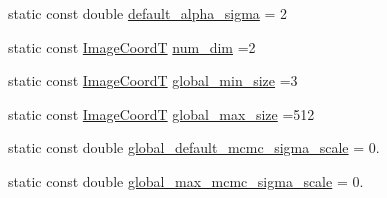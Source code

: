 \begin{DoxyCompactItemize}
static const double \hyperlink{classmappel_1_1PointEmitterModel_a0d9f2c5438940f329e75708987e8b343}{default\+\_\+alpha\+\_\+sigma} = 2
\item 
static const \hyperlink{classmappel_1_1ImageFormat2DBase_a45e9234d63c357f34ca56c72c12b9e9c}{Image\+CoordT} \hyperlink{classmappel_1_1ImageFormat2DBase_a9c29fcaf30faffc77b41ba556ebb0127}{num\+\_\+dim} =2
\item 
static const \hyperlink{classmappel_1_1ImageFormat2DBase_a45e9234d63c357f34ca56c72c12b9e9c}{Image\+CoordT} \hyperlink{classmappel_1_1ImageFormat2DBase_a1149e8545d3cfaa40c2f3bc02e3223b2}{global\+\_\+min\+\_\+size} =3
\item 
static const \hyperlink{classmappel_1_1ImageFormat2DBase_a45e9234d63c357f34ca56c72c12b9e9c}{Image\+CoordT} \hyperlink{classmappel_1_1ImageFormat2DBase_a11c9bb87930f597dff17e9923b73bf5e}{global\+\_\+max\+\_\+size} =512
\item 
static const double \hyperlink{classmappel_1_1MCMCAdaptorBase_a44cebca0e27135c854fa8430d2d89929}{global\+\_\+default\+\_\+mcmc\+\_\+sigma\+\_\+scale} = 0.
\item 
static const double \hyperlink{classmappel_1_1MCMCAdaptorBase_aebc93881ca351e67de867238a62579eb}{global\+\_\+max\+\_\+mcmc\+\_\+sigma\+\_\+scale} = 0.
\end{DoxyCompactItemize}
